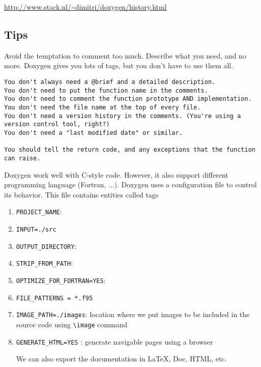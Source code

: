 \url{http://www.stack.nl/~dimitri/doxygen/history.html}

\subsection{Tips}
Avoid the temptation to comment too much. Describe what you need, and no more.
Doxygen gives you lots of tags, but you don't have to use them all.
\begin{verbatim}
You don't always need a @brief and a detailed description.
You don't need to put the function name in the comments.
You don't need to comment the function prototype AND implementation.
You don't need the file name at the top of every file.
You don't need a version history in the comments. (You're using a version control tool, right?)
You don't need a "last modified date" or similar.

You should tell the return code, and any exceptions that the function can raise. 
\end{verbatim}

Doxygen work well with C-style code. However, it also support
different programming language (Fortran, ...). Doxygen uses a configuration file
to control its behavior. This file contains entities called tags
\begin{enumerate}
  \item \verb!PROJECT_NAME!:
  \item \verb!INPUT=./src!
  \item \verb!OUTPUT_DIRECTORY!:
  \item \verb!STRIP_FROM_PATH!:
  \item \verb!OPTIMIZE_FOR_FORTRAN=YES!:
  \item \verb!FILE_PATTERNS = *.f95!
  \item \verb!IMAGE_PATH=./images!: location where we put images to be included
  in the source code using \verb!\image! command
  \item \verb!GENERATE_HTML=YES! : generate navigable pages using a browser
  
  We can also export the documentation in LaTeX, Doc, HTML, etc.
\end{enumerate}



